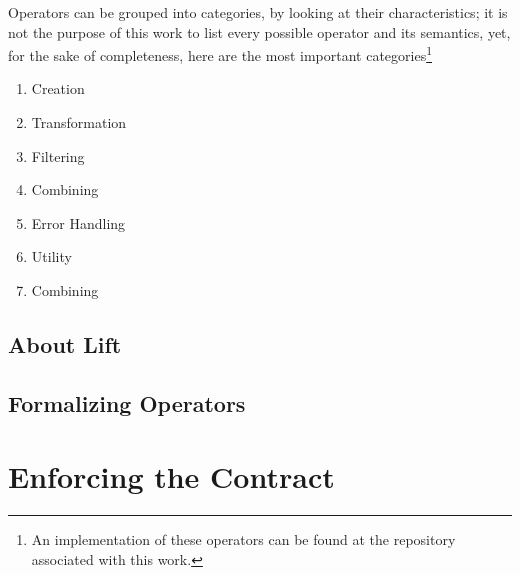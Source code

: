 Operators can be grouped into categories, by looking at their characteristics; it is not the purpose of this work to list every possible operator and its semantics, yet, for the sake of completeness, here are the most important categories\footnote{An implementation of these operators can be found at the repository associated with this work.}

\begin{enumerate}
\item{Creation}
\item{Transformation}
\item{Filtering}
\item{Combining}
\item{Error Handling}
\item{Utility}
\item{Combining}
\end{enumerate}

\subsection{About Lift}
\subsection{Formalizing Operators}

\section{Enforcing the Contract}